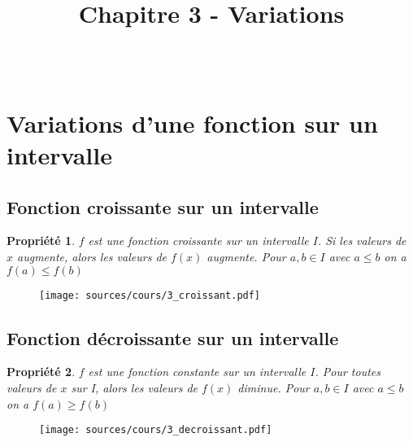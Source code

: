 \documentclass[paper=a4, fontsize=9pt]{scrartcl} %
\title{	
  \vspace{-10ex}
  \horrule{0.5pt} \\[0.4cm] %
  \huge Chapitre 3 - Variations\\ %
  \horrule{2pt} \\[0.5cm] %
}
\author{}
\date{\vspace{-10ex}} %
\begin{document}

\newtheorem{Definition}{Définition}
\newtheorem{Theorem}{Théorème}
\newtheorem{Proposition}{Propriété}

\renewcommand{\labelitemi}{$\bullet$}
\renewcommand{\labelitemii}{$\circ$}

\maketitle %
\setlength{\columnseprule}{1pt}

\section{Variations d'une fonction sur un intervalle}

\begin{multicols}{2}

  \subsection{Fonction croissante sur un intervalle}

  \begin{Proposition}
    $f$ est une fonction croissante sur un intervalle $I$.
    Si les valeurs de $x$ augmente, alors les valeurs de $f(x)$ augmente. Pour $a,b \in I$ avec $a \leq b$ on a $f(a) \leq f(b)$
  \end{Proposition}

  \begin{figure}[H]
    \centering
    \texttt{[image: sources/cours/3\_croissant.pdf]}
  \end{figure}

  \subsection{Fonction décroissante sur un intervalle}

  \begin{Proposition} $f$ est une fonction constante sur un intervalle $I$.
    Pour toutes valeurs de $x$ sur I, alors les valeurs de $f(x)$ diminue. Pour $a,b \in I$ avec $a \leq b$ on a $f(a) \geq f(b)$
  \end{Proposition}

  \begin{figure}[H]
    \centering
    \texttt{[image: sources/cours/3\_decroissant.pdf]}
  \end{figure}

\end{multicols}
\end{document}
